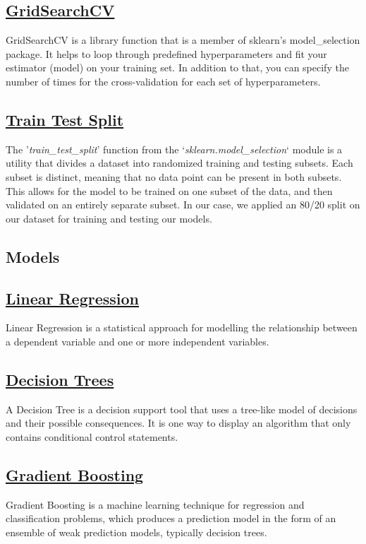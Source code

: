\documentclass[conference]{IEEEtran}
\begin{document}
    \subsection*{\href{https://scikit-learn.org/stable/modules/generated/sklearn.model_selection.GridSearchCV.html}{GridSearchCV}}
    GridSearchCV is a library function that is a member of sklearn's model\_selection package. It helps to loop through predefined hyperparameters and fit your estimator (model) on your training set. In addition to that, you can specify the number of times for the cross-validation for each set of hyperparameters.

    \subsection*{\href{https://scikit-learn.org/stable/modules/generated/sklearn.model_selection.train_test_split.html}{Train Test Split}}
    The '\textit{train\_test\_split}' function from the `\textit{sklearn.model\_selection}` module is a utility that divides a dataset into randomized training and testing subsets. Each subset is distinct, meaning that no data point can be present in both subsets. This allows for the model to be trained on one subset of the data, and then validated on an entirely separate subset. In our case, we applied an 80/20 split on our dataset for training and testing our models.

    \subsection*{Models}
    \subsection{\href{https://en.wikipedia.org/wiki/Linear_regression}{Linear Regression}}
    Linear Regression is a statistical approach for modelling the relationship between a dependent variable and one or more independent variables.
    \subsection{\href{https://en.wikipedia.org/wiki/Decision_tree}{Decision Trees}}
    A Decision Tree is a decision support tool that uses a tree-like model of decisions and their possible consequences. It is one way to display an algorithm that only contains conditional control statements.
    \subsection{\href{https://en.wikipedia.org/wiki/Gradient_boosting}{Gradient Boosting}}
    Gradient Boosting is a machine learning technique for regression and classification problems, which produces a prediction model in the form of an ensemble of weak prediction models, typically decision trees.
\end{document}
